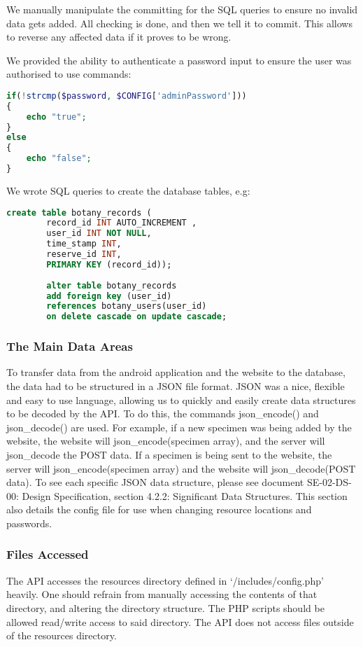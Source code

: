         We manually manipulate the committing for the SQL queries to ensure no invalid data gets added. All checking is done, and then we tell it to commit. This allows to reverse any affected data if it proves to be wrong.

        We provided the ability to authenticate a password input to ensure the user was authorised to use commands:
        \begin{lstlisting}[language=php]
if(!strcmp($password, $CONFIG['adminPassword']))    
{
    echo "true";
}
else
{
    echo "false";
}
        \end{lstlisting}
    
    We wrote SQL queries to create the database tables, e.g:
    \begin{lstlisting}[language=sql]
        create table botany_records ( 
        record_id INT AUTO_INCREMENT , 
        user_id INT NOT NULL, 
        time_stamp INT,
        reserve_id INT,
        PRIMARY KEY (record_id));
        
        alter table botany_records
        add foreign key (user_id)  
        references botany_users(user_id)  
        on delete cascade on update cascade;
    \end{lstlisting}

    \subsubsection{The Main Data Areas}
        To transfer data from the android application and the website to the database,  the data had to be structured in a JSON file format. JSON was a nice, flexible and easy to use language, allowing us to quickly and easily create data structures to be decoded by the API. To do this, the commands json\_encode() and json\_decode() are used. For example, if a new specimen was being added by the website, the website will json\_encode(specimen array), and the server will json\_decode the POST data. If a specimen is being sent to the website, the server will json\_encode(specimen array) and the website will json\_decode(POST data). To see each specific JSON data structure, please see document SE-02-DS-00: Design Specification, section 4.2.2: Significant Data Structures. This section also details the config file for use when changing resource locations and passwords. 

    \subsubsection{Files Accessed}
        The API accesses the resources directory defined in `/includes/config.php' heavily. One should refrain from manually accessing the contents of that directory, and altering the directory structure. The PHP scripts should be allowed read/write access to said directory. The API does not access files outside of the resources directory.

